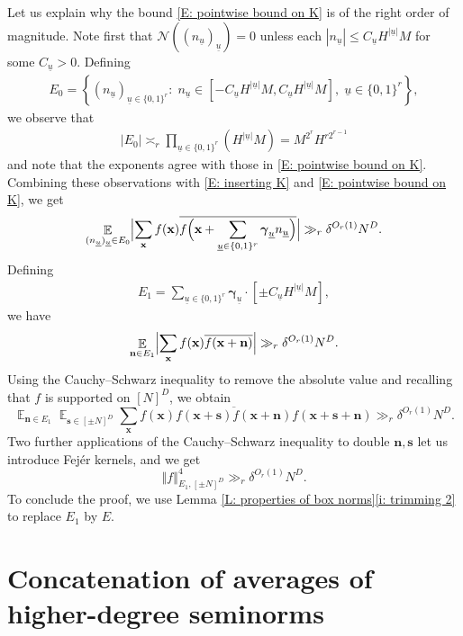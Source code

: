 \documentclass[11pt]{amsart}
\theoremstyle{definition}
\DeclareMathOperator*{\E}{\mathbb{E}}
\newcommand{\CN}{{\mathcal N}}
\newcommand{\bn}{{\mathbf{n}}}
\newcommand{\bx}{{\textbf{x}}}
\newcommand{\bs}{{\mathbf{s}}}
\newcommand{\bgamma}{{\boldsymbol{\gamma}}}
\newcommand{\uu}{{\underline{u}}}
\newcommand{\norm}[1]{\left\Vert #1\right\Vert}
\newcommand{\Bigabs}[1]{\Bigl| #1 \Bigr|}
\newcommand{\brac}[1]{\mathopen{}\left( #1 \mathclose{}\right)}
\newcommand{\Bigbrac}[1]{\Bigl( #1 \Bigr)}
\begin{document}
Let us explain why the bound \eqref{E: pointwise bound on K} is of the right order of magnitude.  Note first that $\CN((n_\uu)_\uu) = 0$ unless each $|n_\uu|\leq C_\uu H^{|\uu|} M$ for some $C_\uu>0$. Defining
    \begin{align*}
        E_0 = \left\{(n_\uu)_{\uu\in\{0,1\}^{r}}:\; n_\uu \in [-C_\uu H^{|\uu|}M, C_\uu H^{|\uu|}M],\; \uu\in\{0,1\}^{r} \right\},
    \end{align*}
we observe that
\begin{align*}
    |E_0|\asymp_{r} \prod_{\uu\in\{0,1\}^r} (H^{|\uu|}M) = M^{2^r} H^{r 2^{r-1}}
\end{align*}
and note that the exponents agree with those in \eqref{E: pointwise bound on K}. Combining these observations with \eqref{E: inserting K} and \eqref{E: pointwise bound on K}, we get
\begin{align*}
    \E_{(n_\uu)_\uu\in E_0}\Bigabs{\sum_\bx f(\bx) \overline{f\Bigbrac{\bx + \sum_{\uu\in\{0,1\}^{r}}\bgamma_\uu n_\uu}}} \gg_r \delta^{O_r(1)} N^D.
\end{align*}
Defining
    \begin{align*}
        E_1 =
        \sum_{\uu\in\{0,1\}^{r}}\bgamma_\uu\cdot[\pm C_\uu H^{|\uu|}M],
    \end{align*}
we have
\begin{align*}
    \E_{\bn\in E_1}\Bigabs{\sum_\bx f(\bx) \overline{f\brac{\bx + \bn}}} \gg_r \delta^{O_r(1)} N^D.
\end{align*}
Using the Cauchy--Schwarz inequality to remove the absolute value and recalling that $f$ is supported on $[N]^D$, we obtain
$$\E_{\bn\in E_1} \E_{\bs \in [\pm N]^D}\sum_\bx f(\bx) \overline{f(\bx+\bs)f(\bx+\bn)}f(\bx+\bs+\bn) \gg_r \delta^{O_r(1)} N^D.$$
Two further applications of the Cauchy--Schwarz inequality to double $\bn,\bs$ let us introduce Fej\'er kernels, and we get
$$\norm{f}^4_{E_1, [\pm N]^D} \gg_r \delta^{O_r(1)} N^D.$$
To conclude the proof, we use Lemma \ref{L: properties of box norms}\eqref{i: trimming 2} to replace $E_1$ by $E$.





\section{Concatenation of averages of higher-degree seminorms}\label{S: general concatenation}
\end{document}
